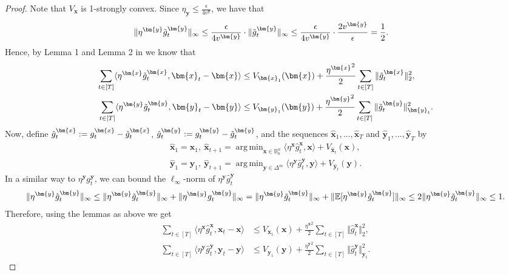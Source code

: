 \documentclass[10pt]{article} %
\def\vx{{\bm{x}}}
\def\vy{{\bm{y}}}
\def\sB{{\mathbb{B}}}
\newcommand{\E}{\mathbb{E}}
\DeclareMathOperator*{\argmin}{arg\,min}
\begin{document}
\begin{proof}
    Note that $V_\vx$ is 1-strongly convex. Since $\eta_\vy\leq \frac{\epsilon}{4v^\vy}$, we have that
    \begin{align*}
        \Vert \eta^\vy \Tilde{g}^\vy_t \Vert_\infty &\leq \frac{\epsilon}{4v^\vy} \cdot \Vert \Tilde{g}^\vy_t \Vert_\infty \leq \frac{\epsilon}{4v^\vy} \cdot \frac{2v^\vy}{\epsilon} = \frac{1}{2}.
    \end{align*}
    Hence, by Lemma 1 and Lemma 2 in \cite{Jin2020} we know that
    \begin{align*}
        \sum\limits_{t\in[T]} \langle \eta^\vx \Tilde{g}^\vx_t, \vx_t - \vx \rangle &\leq V_{\vx_1}(\vx) + \frac{{\eta^\vx}^2}{2}\sum\limits_{t\in[T]}\Vert \Tilde{g}^\vx_t\Vert^2_2,\\
        \sum\limits_{t\in[T]} \langle \eta^\vy \Tilde{g}^\vy_t, \vy_t - \vy \rangle &\leq V_{\vy_1}(\vy) + \frac{{\eta^\vy}^2}{2}\sum\limits_{t\in[T]}\Vert \Tilde{g}^\vy_t\Vert^2_{\vy_t}.
    \end{align*}
    Now, define $\hat{g}^\vx_t := g^\vx_t - \Tilde{g}^\vx_t$, $\hat{g}^\vy_t := g^\vy_t - \Tilde{g}^\vy_t$, and the sequences $\hat{\vx}_1,...,\hat{\vx}_T$ and $\hat{\vy}_1,...,\hat{\vy}_T$ by
    \begin{align*}
        \hat{\vx}_1 = \vx_1, \: \hat{\vx}_{t+1} = \argmin_{\vx\in\sB^n_b} \langle \eta^\vx\hat{g}^\vx_t, \vx \rangle + V_{\hat{\vx}_t}(\vx),\\
        \hat{\vy}_1 = \vy_1, \: \hat{\vy}_{t+1} = \argmin_{\vy\in\Delta^m} \langle \eta^\vy\hat{g}^\vy_t, \vy \rangle + V_{\hat{\vy}_t}(\vy).
    \end{align*}
    In a similar way to $\eta^\vy g^\vy_t$, we can bound the $\ell_\infty$-norm of $\eta^\vy \hat{g}^\vy_t$
    \begin{align*}
        \Vert \eta^\vy \hat{g}^\vy_t\Vert_\infty \leq \Vert \eta^\vy \Tilde{g}^\vy_t\Vert_\infty + \Vert \eta^\vy g^\vy_t\Vert_\infty = \Vert \eta^\vy \Tilde{g}^\vy_t\Vert_\infty + \Vert \E[\eta^\vy \Tilde{g}^\vy_t]\Vert_\infty \leq 2\Vert \eta^\vy \Tilde{g}^\vy_t\Vert_\infty \leq 1.
    \end{align*}
    Therefore, using the lemmas as above we get
    \begin{align*}
        \sum\limits_{t\in[T]} \langle \eta^\vx \hat{g}^\vx_t, \vx_t - \vx \rangle &\leq V_{\vx_1}(\vx) + \frac{{\eta^\vx}^2}{2}\sum\limits_{t\in[T]}\Vert \hat{g}^\vx_t\Vert^2_2,\\
        \sum\limits_{t\in[T]} \langle \eta^\vy \hat{g}^\vy_t, \vy_t - \vy \rangle &\leq V_{\vy_1}(\vy) + \frac{{\eta^\vy}^2}{2}\sum\limits_{t\in[T]}\Vert \hat{g}^\vy_t\Vert^2_{\vy_t}.

\end{align*}
\end{proof}
\end{document}
